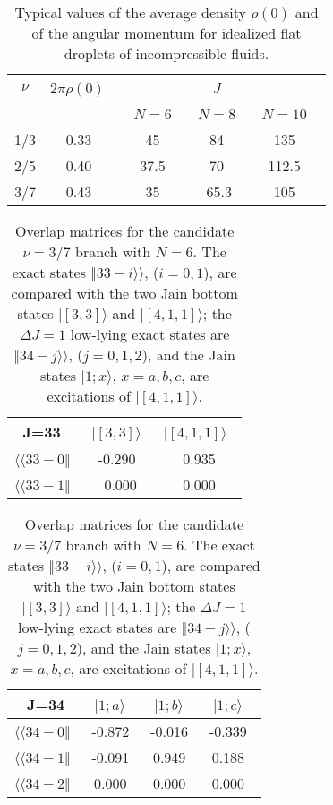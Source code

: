 \begin{table}
\caption{Typical values of the average density $\rho(0)$
and of the angular momentum
for idealized flat droplets of incompressible fluids.}
\label{tab40}
\vspace{0.4cm}
\begin{center}
\begin{tabular}{|c|c|c c c|} 
\hline
$\nu $ &$2\pi\rho(0)$\ \ &         &  $J$ \   &  \\
       &                 & $N=6$ \ & $N=8$ \ & $N=10$ \ \\
\hline
1/3  & 0.33 \ &  45 \  & 84 \ & 135 \ \\
2/5  & 0.40 \ & 37.5 \ & 70 \ & 112.5 \ \\
3/7  & 0.43 \ &  35 \  & 65.3\ & 105 \ \\
\hline 
\end{tabular}
\end{center}
\end{table}

\begin{table}
\caption{Overlap matrices for the candidate $\nu=3/7$ branch with
$N=6$. The exact states $\Vert 33-i \rangle\rangle$, ($i=0,1$), are 
compared with the two Jain bottom states $\vert [3,3] \rangle$ and
$\vert [4,1,1] \rangle$; the $\Delta J=1$ low-lying exact states are
$\Vert 34-j \rangle\rangle$, ($j=0,1,2$), and the Jain states
$\vert 1; x\rangle$, $x=a,b,c$, are excitations
of $\vert [4,1,1] \rangle$.} 
\label{tab5}
\vspace{0.4cm}
\begin{center}
\begin{tabular}{|c|c|c|}
\hline 
J=33\  & $\vert [3,3] \rangle$\ & $\vert [4,1,1] \rangle$\ \\ 
\hline
$\langle\langle 33- 0\Vert$\  &  -0.290\ & 0.935 \\ 
$\langle\langle 33- 1\Vert$\  &\ 0.000\  & 0.000 \\
\end{tabular}
\begin{tabular}{|c|c|c|c|} 
J=34 & $\vert 1;a\rangle$\ & $\vert 1;b\rangle$\ & $\vert 1;c\rangle$\  \\ 
\hline
$\langle\langle 34-0\Vert$\ & -0.872\ & -0.016\ & -0.339\ \\
$\langle\langle 34-1\Vert$\ & -0.091\ & 0.949\  & 0.188\  \\
$\langle\langle 34-2\Vert$\ & 0.000\  & 0.000\  & 0.000\  \\
\hline
\end{tabular}
\end{center}
\end{table}

